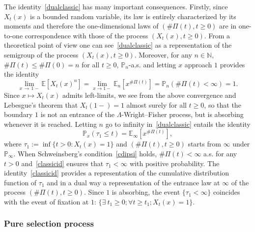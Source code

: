 \documentclass[AHL,Unicode,longabstracts,published]{cedram}
\newcommand{\bbN}{\mathbb{N}}
\newcommand{\bbE}{\mathbb{E}}
\newcommand{\bbP}{\mathbb{P}}
\let\oldexists\exists
\renewcommand*{\exists}{\mathrel{\oldexists}}
\let\oldforall\forall
\renewcommand*{\forall}{\mathrel{\oldforall}}
\begin{document}
The identity~\eqref{dualclassic} has many important consequences. Firstly, since $X_t(x)$ is a bounded random variable, its law is entirely characterized by its moments and therefore the one-dimensional laws of $(\#\Pi(t),t\geq 0)$ are in one-to-one correspondence with those of the process $(X_t(x),t\geq 0)$. From a theoretical point of view one can see~\eqref{dualclassic} as a representation of the semigroup of the process $(X_t(x),t\geq 0)$. Moreover, for any $n\in \bbN$, $\#\Pi(t)\leq \#\Pi(0)=n$ for all $t\geq 0$, $\bbP_n$-a.s. and letting $x$ approach $1$ provides the identity
\[
\underset{x\,\rightarrow\,1-}{\lim}\bbE\left[X_t(x)^n\right]=\underset{x\rightarrow 1-}{\lim}\bbE_n\left[x^{\#\Pi(t)}\right]=\bbP_n(\#\Pi(t)<\infty)=1.
\]
Since $x\mapsto X_t(x)$ admits left-limits, we see from the above convergence and Lebesgue's theorem that $X_t(1-)=1$ almost surely for all $t\geq 0$, so that the boundary $1$ is not an entrance of the $\Lambda$-Wright--Fisher process, but is absorbing whenever it is reached. Letting $n$ go to infinity in~\eqref{dualclassic} entails the identity
\begin{equation}\label{classicid}
\bbP_x(\tau_1\leq t)=\bbE_{\infty}\left[x^{\#\Pi(t)}\right],
\end{equation}
where $\tau_1:=\inf\{t>0: X_t(x)=1\}$ and $(\#\Pi(t),t\geq 0)$ starts from $\infty$ under $\bbP_\infty$. When Schweinsberg's condition~\eqref{cdipsi} holds, $\#\Pi(t)<\infty$ a.s. for any $t>0$ and~\eqref{classicid} ensures that $\tau_1<\infty$ with positive probability. The identity~\eqref{classicid} provides a representation of the cumulative distribution function of $\tau_1$ and in a dual way a representation of the entrance law at $\infty$ of the process $(\#\Pi(t),t\geq 0)$. Since $1$ is absorbing, the event $\{\tau_1<\infty\}$ coincides with the event of fixation at $1$: $\{\exists \ t_1\geq 0; \forall t\geq t_1; X_t(x)=1\}$.


\subsubsection{Pure selection process}
\end{document}
